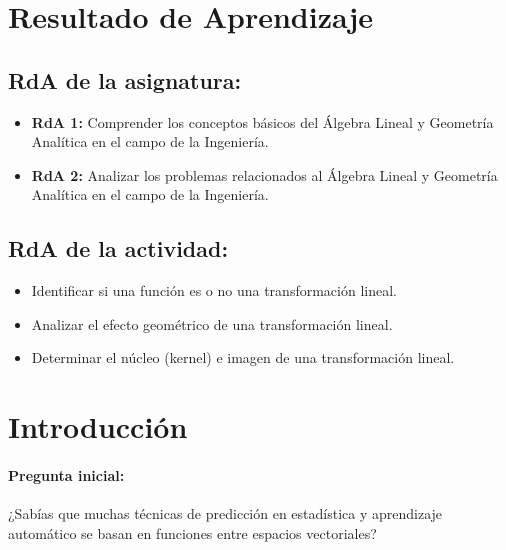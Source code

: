 \documentclass[a4,11pt]{aleph-notas}
\begin{document}
\encabezado

\section*{Resultado de Aprendizaje}

\subsection*{RdA de la asignatura:}
\begin{itemize}[leftmargin=*]
    \item \textbf{RdA 1:} Comprender los conceptos básicos del Álgebra Lineal y Geometría Analítica en el campo de la Ingeniería.
    \item \textbf{RdA 2:} Analizar los problemas relacionados al Álgebra Lineal y Geometría Analítica en el campo de la Ingeniería.
\end{itemize}

\subsection*{RdA de la actividad:}
\begin{itemize}[leftmargin=*]
    \item Identificar si una función es o no una transformación lineal.
    \item Analizar el efecto geométrico de una transformación lineal.
    \item Determinar el núcleo (kernel) e imagen de una transformación lineal.
\end{itemize}

\section*{Introducción}

\paragraph{Pregunta inicial:}  
¿Sabías que muchas técnicas de predicción en estadística y aprendizaje automático se basan en funciones entre espacios vectoriales? 

\end{document}
